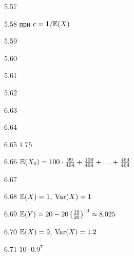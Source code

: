 \protect \hypertarget {soln:5.57}{}
\begin{solution}{{5.57}}
\end{solution}
\protect \hypertarget {soln:5.58}{}
\begin{solution}{{5.58}}
при $c=1/\mathbb{E}(X)$
\end{solution}
\protect \hypertarget {soln:5.59}{}
\begin{solution}{{5.59}}
\end{solution}
\protect \hypertarget {soln:5.60}{}
\begin{solution}{{5.60}}
\end{solution}
\protect \hypertarget {soln:5.61}{}
\begin{solution}{{5.61}}
\end{solution}
\protect \hypertarget {soln:5.62}{}
\begin{solution}{{5.62}}
\end{solution}
\protect \hypertarget {soln:6.63}{}
\begin{solution}{{6.63}}
\end{solution}
\protect \hypertarget {soln:6.64}{}
\begin{solution}{{6.64}}
\end{solution}
\protect \hypertarget {soln:6.65}{}
\begin{solution}{{6.65}}
$1.75$
\end{solution}
\protect \hypertarget {soln:6.66}{}
\begin{solution}{{6.66}}
  $\mathbb{E}(X_0)=100\cdot \frac{99}{464} + \frac{100}{464} + \ldots + \frac{464}{464}$
\end{solution}
\protect \hypertarget {soln:6.67}{}
\begin{solution}{{6.67}}
\end{solution}
\protect \hypertarget {soln:6.68}{}
\begin{solution}{{6.68}}
$\mathbb{E}(X)=1$, $\operatorname{Var}(X)=1$
\end{solution}
\protect \hypertarget {soln:6.69}{}
\begin{solution}{{6.69}}
$\mathbb{E}(Y)=20-20 \left( \frac{19}{20} \right)^{10}\approx 8.025$
\end{solution}
\protect \hypertarget {soln:6.70}{}
\begin{solution}{{6.70}}
$\mathbb{E}(X)=9$, $\operatorname{Var}(X)=1.2$
\end{solution}
\protect \hypertarget {soln:6.71}{}
\begin{solution}{{6.71}}
  $10 \cdot 0.9^7$
\end{solution}
\protect \hypertarget {soln:6.72}{}
